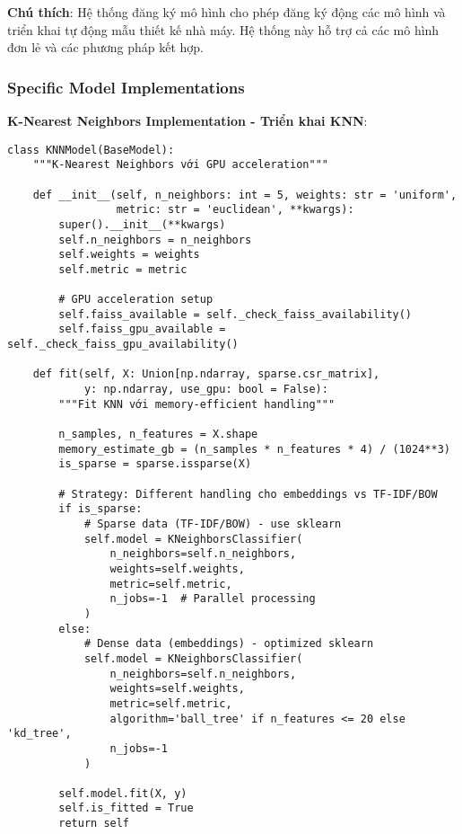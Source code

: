 \textbf{Chú thích}: Hệ thống đăng ký mô hình cho phép đăng ký động các mô hình và triển khai tự động mẫu thiết kế nhà máy. Hệ thống này hỗ trợ cả các mô hình đơn lẻ và các phương pháp kết hợp.

\subsubsection{Specific Model Implementations}

\textbf{K-Nearest Neighbors Implementation - Triển khai KNN}:

\begin{verbatim}
class KNNModel(BaseModel):
    """K-Nearest Neighbors với GPU acceleration"""
    
    def __init__(self, n_neighbors: int = 5, weights: str = 'uniform', 
                 metric: str = 'euclidean', **kwargs):
        super().__init__(**kwargs)
        self.n_neighbors = n_neighbors
        self.weights = weights
        self.metric = metric
        
        # GPU acceleration setup
        self.faiss_available = self._check_faiss_availability()
        self.faiss_gpu_available = self._check_faiss_gpu_availability()
        
    def fit(self, X: Union[np.ndarray, sparse.csr_matrix], 
            y: np.ndarray, use_gpu: bool = False):
        """Fit KNN với memory-efficient handling"""
        
        n_samples, n_features = X.shape
        memory_estimate_gb = (n_samples * n_features * 4) / (1024**3)
        is_sparse = sparse.issparse(X)
        
        # Strategy: Different handling cho embeddings vs TF-IDF/BOW
        if is_sparse:
            # Sparse data (TF-IDF/BOW) - use sklearn
            self.model = KNeighborsClassifier(
                n_neighbors=self.n_neighbors,
                weights=self.weights,
                metric=self.metric,
                n_jobs=-1  # Parallel processing
            )
        else:
            # Dense data (embeddings) - optimized sklearn
            self.model = KNeighborsClassifier(
                n_neighbors=self.n_neighbors,
                weights=self.weights,
                metric=self.metric,
                algorithm='ball_tree' if n_features <= 20 else 'kd_tree',
                n_jobs=-1
            )
            
        self.model.fit(X, y)
        self.is_fitted = True
        return self
\end{verbatim}

